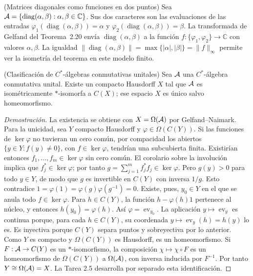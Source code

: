 \begin{cthejemplo}{(Matrices diagonales como funciones en dos puntos)}
Sea $\mathcal A=\{\operatorname{diag}(\alpha,\beta):\alpha,\beta\in\mathbb C\}$.
Sus dos caracteres son las evaluaciones de las entradas
$\varphi_1(\operatorname{diag}(\alpha,\beta))=\alpha$ y
$\varphi_2(\operatorname{diag}(\alpha,\beta))=\beta$.
La transformada de Gelfand del Teorema~2.20 envía
$\operatorname{diag}(\alpha,\beta)$ a la función
$f:\{\varphi_1,\varphi_2\}\to\mathbb C$ con valores $\alpha,\beta$.
La igualdad $\|\operatorname{diag}(\alpha,\beta)\|=\max\{|\alpha|,|\beta|\}
=\|f\|_\infty$ permite ver la isometría del teorema en este modelo finito.
\end{cthejemplo}

\begin{cthcorolario}{(Clasificación de $C^*$-álgebras conmutativas unitales)}
Sea $\mathcal A$ una $C^*$-álgebra conmutativa unital. Existe un compacto Hausdorff $X$ tal que
$\mathcal A$ es isométricamente $*$-isomorfa a $C(X)$; ese espacio $X$ es único salvo homeomorfismo.
\end{cthcorolario}

\begin{proof}[Demostración]
La existencia se obtiene con $X=\Omega(\mathcal A)$ por Gelfand--Naimark.
Para la unicidad, sea $Y$ compacto Hausdorff y $\varphi\in\Omega(C(Y))$.
Si las funciones de $\ker\varphi$ no tuvieran un cero común, por compacidad
los abiertos $\{y\in Y:f(y)\neq0\}$, con $f\in\ker\varphi$, tendrían una
subcubierta finita. Existirían entonces $f_1,\ldots,f_m\in\ker\varphi$
sin cero común. El corolario sobre la
involución implica que $f_j^*\in\ker\varphi$; por tanto
$g=\sum_{j=1}^m f_j^*f_j\in\ker\varphi$. Pero $g(y)>0$ para todo $y\in Y$,
de modo que $g$ es invertible en $C(Y)$ con inversa $1/g$. Esto contradice
$1=\varphi(1)=\varphi(g)\varphi(g^{-1})=0$.
Existe, pues, $y_0\in Y$ en el que se anula todo $f\in\ker\varphi$.
Para $h\in C(Y)$, la función $h-\varphi(h)1$ pertenece al núcleo, y entonces
$h(y_0)=\varphi(h)$. Así $\varphi=\operatorname{ev}_{y_0}$.
La aplicación $y\mapsto\operatorname{ev}_y$ es continua porque, para cada
$h\in C(Y)$, su coordenada $y\mapsto\operatorname{ev}_y(h)=h(y)$ lo es.
Es inyectiva porque $C(Y)$ separa puntos y sobreyectiva por lo anterior.
Como $Y$ es compacto y $\Omega(C(Y))$ es Hausdorff, es un homeomorfismo.
Si $F:\mathcal A\to C(Y)$ es un $*$-isomorfismo, la composición
$\chi\mapsto\chi\circ F$ es un homeomorfismo de $\Omega(C(Y))$ a
$\Omega(\mathcal A)$, con inversa inducida por $F^{-1}$. Por tanto
$Y\cong\Omega(\mathcal A)=X$. La Tarea 2.5 desarrolla por separado esta identificación.
\end{proof}

